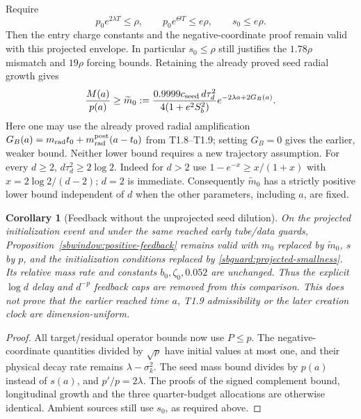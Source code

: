 \documentclass{article} %
\theoremstyle{plain}
\newtheorem{corollary}[theorem]{Corollary}
\theoremstyle{definition}
\theoremstyle{remark}
\begin{document}
Require
\begin{equation}\label{sbguard:projected-smallness}
 p_0e^{2\lambda T}\le\rho,\qquad
 p_0e^{\Theta T}\le e\rho,\qquad s_0\le e\rho.
\end{equation}
Then the entry charge constants and the negative-coordinate proof remain
valid with this projected envelope. In particular $s_0\le\rho$ still
justifies the $1.78\rho$ mismatch and $19\rho$ forcing bounds.
Retaining the already proved seed radial growth gives
\begin{equation}\label{sbguard:projected-seed}
 \frac{M(a)}{p(a)}\ge\widetilde m_0:={0.9999c_{\rm seed}\,d\tau_d^2
                      \over4(1+e^2S_b^2)}e^{-2\lambda a+2G_B(a)}.
\end{equation}
Here one may use the already proved radial amplification
$G_B(a)=m_{\rm rad}t_0+m_{\rm rad}^{\rm post}(a-t_0)$ from T1.8--T1.9;
setting $G_B=0$ gives the earlier, weaker bound. Neither lower bound
requires a new trajectory assumption.
For every $d\ge2$, $d\tau_d^2\ge2\log2$. Indeed for $d>2$ use
$1-e^{-x}\ge x/(1+x)$ with $x=2\log2/(d-2)$; $d=2$ is immediate.
Consequently $\widetilde m_0$ has a strictly positive lower bound
independent of $d$ when the other parameters, including $a$, are fixed.

\begin{corollary}[Feedback without the unprojected seed dilution]
\label{sbguard:projected-feedback}
On the projected initialization event and under the same reached early
tube/data guards, Proposition~\ref{sbwindow:positive-feedback} remains
valid with $m_0$ replaced by $\widetilde m_0$, $s$ by $p$, and the
initialization conditions replaced by \eqref{sbguard:projected-smallness}.
Its relative mass rate and constants $b_0,\zeta_0,0.052$ are unchanged.
Thus the explicit $\log d$ delay and $d^{-p}$ feedback caps are removed
from this comparison. This does not prove that the earlier reached time
$a$, T1.9 admissibility or the later creation clock are dimension-uniform.
\end{corollary}
\begin{proof}
All target/residual operator bounds now use $P\le p$.
The negative-coordinate quantities divided by $\sqrt p$ have initial
values at most one, and their physical decay rate remains
$\lambda-\sigma_k^2$. The seed mass bound divides by $p(a)$ instead of
$s(a)$, and $p'/p=2\lambda$. The proofs of the signed complement bound,
longitudinal growth and the three quarter-budget allocations are
otherwise identical. Ambient sources still use $s_0$, as required above.
\end{proof}
\end{document}
